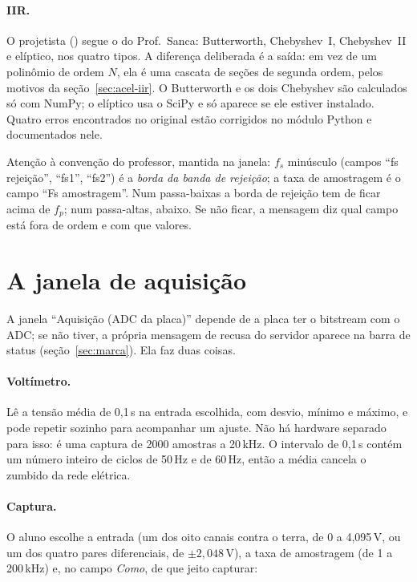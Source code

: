 \paragraph{IIR.} O projetista () segue o
 do Prof.\ Sanca: Butterworth, Chebyshev~I, Chebyshev~II
e elíptico, nos quatro tipos. A diferença deliberada é a saída: em vez de um
polinômio de ordem \(N\), ela é uma cascata de seções de segunda ordem, pelos
motivos da seção~\ref{sec:acel-iir}. O Butterworth e os dois Chebyshev são
calculados só com NumPy; o elíptico usa o SciPy e só aparece se ele estiver
instalado. Quatro erros encontrados no  original estão corrigidos no
módulo Python e documentados nele.

Atenção à convenção do professor, mantida na janela: \(f_s\) minúsculo
(campos ``fs rejeição'', ``fs1'', ``fs2'') é a \emph{borda da banda de
rejeição}; a taxa de amostragem é o campo ``Fs amostragem''. Num passa-baixas a
borda de rejeição tem de ficar acima de \(f_p\); num passa-altas, abaixo. Se não
ficar, a mensagem diz qual campo está fora de ordem e com que valores.

\section{A janela de aquisição}
\label{sec:janela-aquisicao}

A janela ``Aquisição (ADC da placa)'' depende de a placa ter o bitstream com o
ADC; se não tiver, a própria mensagem de recusa do servidor aparece na barra de
status (seção~\ref{sec:marca}). Ela faz duas coisas.

\paragraph{Voltímetro.} Lê a tensão média de 0,1\,s na entrada escolhida, com
desvio, mínimo e máximo, e pode repetir sozinho para acompanhar um ajuste. Não
há hardware separado para isso: é uma captura de 2000 amostras a 20\,kHz. O
intervalo de 0,1\,s contém um número inteiro de ciclos de 50\,Hz e de 60\,Hz,
então a média cancela o zumbido da rede elétrica.

\paragraph{Captura.} O aluno escolhe a entrada (um dos oito canais contra o
terra, de 0 a 4,095\,V, ou um dos quatro pares diferenciais, de
\(\pm 2{,}048\)\,V), a taxa de amostragem (de 1 a 200\,kHz) e, no campo
\emph{Como}, de que jeito capturar:

